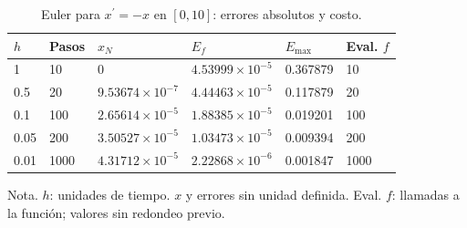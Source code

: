 \begin{table}[H]\centering\small\setlength{\tabcolsep}{4pt}
\caption{Euler para $x^{\prime}=-x$ en $[0,10]$: errores absolutos y costo.}\label{tab:error}
\begin{tabular}{llllll}
\toprule
$h$ & Pasos & $x_N$ & $E_f$ & $E_{\max}$ & Eval. $f$\\
\midrule
1 & 10 & 0 & $4.53999\times 10^{-5}$ & 0.367879 & 10\\
0.5 & 20 & $9.53674\times 10^{-7}$ & $4.44463\times 10^{-5}$ & 0.117879 & 20\\
0.1 & 100 & $2.65614\times 10^{-5}$ & $1.88385\times 10^{-5}$ & 0.019201 & 100\\
0.05 & 200 & $3.50527\times 10^{-5}$ & $1.03473\times 10^{-5}$ & 0.009394 & 200\\
0.01 & 1000 & $4.31712\times 10^{-5}$ & $2.22868\times 10^{-6}$ & 0.001847 & 1000\\
\bottomrule\end{tabular}
\end{table}
{\footnotesize Nota. $h$: unidades de tiempo. $x$ y errores sin unidad definida. Eval. $f$: llamadas a la función; valores sin redondeo previo.}
